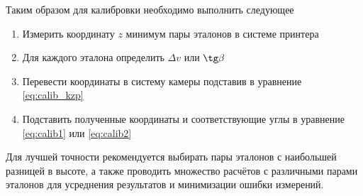         Таким образом для калибровки необходимо выполнить следующее
        \begin{enumerate}
            \item Измерить координату $ z $ минимум пары эталонов в системе принтера
            \item Для каждого эталона определить $ \Delta v $ или $ \tg\beta $
            \item Перевести координаты в систему камеры подставив в уравнение \ref{eq:calib_kzp}
            \item Подставить полученные координаты и соответствующие углы в уравнение \ref{eq:calib1} или \ref{eq:calib2}
        \end{enumerate}
        Для лучшей точности рекомендуется выбирать пары эталонов с наибольшей разницей в высоте, а также проводить множество расчётов с различными парами эталонов для усреднения результатов и минимизации ошибки измерений.